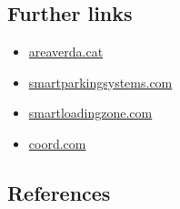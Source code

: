 \documentclass[
]{book}
\providecommand{\tightlist}{%
  \setlength{\itemsep}{0pt}\setlength{\parskip}{0pt}}
\begin{document}
\hypertarget{further-links-21}{%
\subsection*{Further links}\label{further-links-21}}

\begin{itemize}
\tightlist
\item
  \href{https://www.areaverda.cat/index.php/es}{areaverda.cat}
\item
  \href{https://smartparkingsystems.com/en/loading-parking-bay-management/}{smartparkingsystems.com}
\item
  \href{https://www.smartloadingzone.com/en_us/}{smartloadingzone.com}
\item
  \href{https://www.coord.com/blog/comparing-loading-zones}{coord.com}
\end{itemize}

\hypertarget{references-24}{%
\subsection*{References}\label{references-24}}
\end{document}
